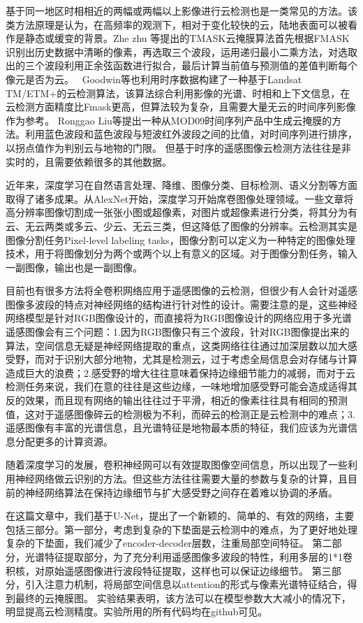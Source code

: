 \documentclass[UTF8]{ctexart}
\begin{document}
基于同一地区时相相近的两幅或两幅以上影像进行云检测也是一类常见的方法。该类方法原理是认为，在高频率的观测下，相对于变化较快的云，陆地表面可以被看作是静态或缓变的背景。Zhe zhu 等\cite{zhu2014automated}提出的TMASK云掩膜算法首先根据FMASK\cite{zhu2012object}识别出历史数据中清晰的像素，再选取三个波段，运用递归最小二乘方法，对选取出的三个波段利用正余弦函数进行拟合，最后计算当前值与预测值的差值判断每个像元是否为云。 
Goodwin等\cite{goodwin2013cloud}也利用时序数据构建了一种基于Landsat TM/ETM+的云检测算法，该算法综合利用影像的光谱、时相和上下文信息，在云检测方面精度比Fmask更高，但算法较为复杂，且需要大量无云的时间序列影像作为参考。
Ronggao Liu等\cite{liu2013generation}提出一种从MOD09时间序列产品中生成云掩膜的方法。利用蓝色波段和蓝色波段与短波红外波段之间的比值，对时间序列进行排序，以拐点值作为判别云与地物的门限。
但基于时序的遥感图像云检测方法往往是非实时的，且需要依赖很多的其他数据。

近年来，深度学习在自然语言处理、降维、图像分类、目标检测、语义分割等方面取得了诸多成果。从AlexNet开始，深度学习开始席卷图像处理领域。一些文章将高分辨率图像切割成一张张小图或超像素，对图片或超像素进行分类，将其分为有云、无云两类或多云、少云、无云三类，但这降低了图像的分辨率。云检测其实是图像分割任务Pixel-level labeling tasks，图像分割可以定义为一种特定的图像处理技术，用于将图像划分为两个或两个以上有意义的区域。对于图像分割任务，输入一副图像，输出也是一副图像。

目前也有很多方法将全卷积网络应用于遥感图像的云检测\cite{chai2019cloud, jeppesen2019cloud}，但很少有人会针对遥感图像多波段的特点对神经网络的结构进行针对性的设计。需要注意的是，这些神经网络模型是针对RGB图像设计的，而直接将为RGB图像设计的网络应用于多光谱遥感图像会有三个问题：1.因为RGB图像只有三个波段，针对RGB图像提出来的算法，空间信息无疑是神经网络提取的重点，这类网络往往通过加深层数以加大感受野，而对于识别大部分地物，尤其是检测云，过于考虑全局信息会对存储与计算造成巨大的浪费；2.感受野的增大往往意味着保持边缘细节能力的减弱，而对于云检测任务来说，我们在意的往往是这些边缘，一味地增加感受野可能会造成适得其反的效果，而且现有网络的输出往往过于平滑，相近的像素往往具有相同的预测值，这对于遥感图像碎云的检测极为不利，而碎云的检测正是云检测中的难点；3.遥感图像有丰富的光谱信息，且光谱特征是地物最本质的特征，我们应该为光谱信息分配更多的计算资源。

随着深度学习的发展，卷积神经网可以有效提取图像空间信息，所以出现了一些利用神经网络做云识别的方法。但这些方法往往需要大量的参数与复杂的计算，且目前的神经网络算法在保持边缘细节与扩大感受野之间存在着难以协调的矛盾。


在这篇文章中，我们基于U-Net，提出了一个新颖的、简单的、有效的网络，主要包括三部分。第一部分，考虑到复杂的下垫面是云检测中的难点，为了更好地处理复杂的下垫面，我们减少了encoder-decoder层数，注重局部空间特征。
第二部分，光谱特征提取部分，为了充分利用遥感图像多波段的特性，利用多层的1*1卷积核，对原始遥感图像进行波段特征提取，这样也可以保证边缘细节。
第三部分，引入注意力机制，将局部空间信息以attention的形式与像素光谱特征结合，得到最终的云掩膜图。
实验结果表明，该方法可以在模型参数大大减小的情况下，明显提高云检测精度。实验所用的所有代码均在github可见。
\end{document}

